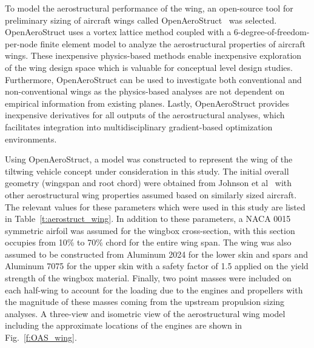 
To model the aerostructural performance of the wing, an open-source tool for preliminary sizing of aircraft wings called OpenAeroStruct~\cite{Jasa2018a} was selected.
OpenAeroStruct uses a vortex lattice method coupled with a 6-degree-of-freedom-per-node finite element model to analyze the aerostructural properties of aircraft wings.
These inexpensive physics-based methods enable inexpensive exploration of the wing design space which is valuable for conceptual level design studies.
Furthermore, OpenAeroStruct can be used to investigate both conventional and non-conventional wings as the physics-based analyses are not dependent on empirical  information from existing planes.
Lastly, OpenAeroStruct provides inexpensive derivatives for all outputs of the aerostructural analyses, which facilitates integration into multidisciplinary gradient-based optimization environments.

Using OpenAeroStruct, a model was constructed to represent the wing of the tiltwing vehicle concept under consideration in this study.
The initial overall geometry (wingspan and root chord) were obtained from Johnson et al~\cite{johnson2018concept} with other aerostructural wing properties assumed based on similarly sized aircraft.
The relevant values for these parameters which were used in this study are listed in Table~\ref{t:aerostruct_wing}.
In addition to these parameters, a NACA 0015 symmetric airfoil was assumed for the wingbox cross-section, with this section occupies from 10\% to 70\% chord for the entire wing span.
The wing was also assumed to be constructed from Aluminum 2024 for the lower skin and spars and Aluminum 7075 for the upper skin with a safety factor of 1.5 applied on the yield strength of the wingbox material.
Finally, two point masses were included on each half-wing to account for the loading due to the engines and propellers with the magnitude of these masses coming from the upstream propulsion sizing analyses.
A three-view and isometric view of the aerostructural wing model including the approximate locations of the engines are shown in Fig.~\ref{f:OAS_wing}.

